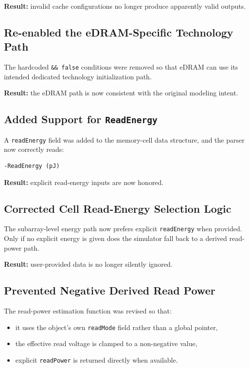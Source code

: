 \documentclass[11pt]{article}
\begin{document}
\textbf{Result:} invalid cache configurations no longer produce apparently valid outputs.

\subsection{Re-enabled the eDRAM-Specific Technology Path}

The hardcoded \texttt{\&\& false} conditions were removed so that eDRAM can use its intended dedicated technology initialization path.

\textbf{Result:} the eDRAM path is now consistent with the original modeling intent.

\subsection{Added Support for \texttt{ReadEnergy}}

A \texttt{readEnergy} field was added to the memory-cell data structure, and the parser now correctly reads:

\begin{verbatim}
-ReadEnergy (pJ)
\end{verbatim}

\textbf{Result:} explicit read-energy inputs are now honored.

\subsection{Corrected Cell Read-Energy Selection Logic}

The subarray-level energy path now prefers explicit \texttt{readEnergy} when provided. Only if no explicit energy is given does the simulator fall back to a derived read-power path.

\textbf{Result:} user-provided data is no longer silently ignored.

\subsection{Prevented Negative Derived Read Power}

The read-power estimation function was revised so that:

\begin{itemize}[leftmargin=1.5em]
    \item it uses the object's own \texttt{readMode} field rather than a global pointer,
    \item the effective read voltage is clamped to a non-negative value,
    \item explicit \texttt{readPower} is returned directly when available.
\end{itemize}
\end{document}
